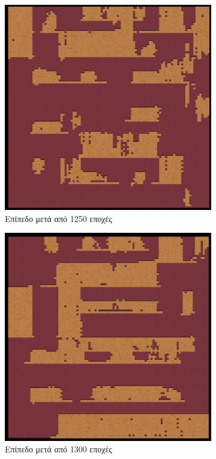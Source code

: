 \begin{figure}[H]
\begin{subfigure}{.5\textwidth}
  \centering
  \includegraphics[width=.8\linewidth]{../images/generated/1250.png}
  \caption{Επίπεδο μετά από 1250 εποχές}
  \label{fig:sfig1}
\end{subfigure}%
\begin{subfigure}{.5\textwidth}
  \centering
  \includegraphics[width=.8\linewidth]{../images/generated/1300.png}
  \caption{Επίπεδο μετά από 1300 εποχές}
  \label{fig:sfig2}
\end{subfigure}
\begin{subfigure}{.5\textwidth}

\end{subfigure}
\end{figure}
